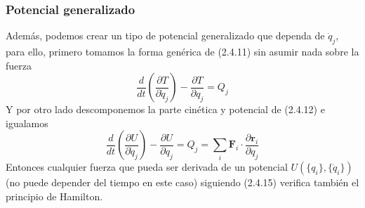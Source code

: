 \subsubsection{Potencial generalizado}
Además, podemos crear un tipo de potencial generalizado que dependa de $\dot{q}_j$, para ello, primero tomamos la forma genérica de (2.4.11) sin asumir nada sobre la fuerza
\begin{equation} \label{2.1.1}
    \frac{d}{dt}\left(\frac{\partial T}{\partial \dot{q}_j}\right)-\frac{\partial T}{\partial q_j} = Q_j
\end{equation} 
Y por otro lado descomponemos la parte cinética y potencial de (2.4.12) e igualamos
\begin{equation} \label{2.1.1}
    \frac{d}{dt}\left(\frac{\partial U}{\partial \dot{q}_j}\right)-\frac{\partial U}{\partial q_j} = Q_j = \sum_i \mathbf{F}_i \cdot \frac{\partial \mathbf{r}_i}{\partial q_j}
\end{equation} 
Entonces cualquier fuerza que pueda ser derivada de un potencial $U(\{q_i\},\{\dot{q}_i\})$ (no puede depender del tiempo en este caso) siguiendo (2.4.15) verifica también el principio de Hamilton.

